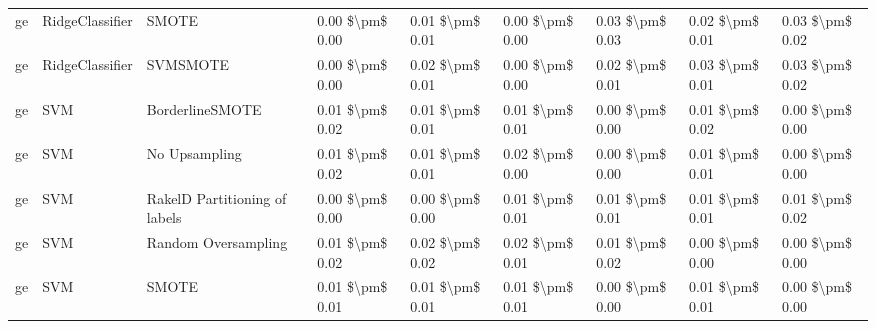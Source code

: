 \begin{tabular}{lllllllll}
      ge &                 RidgeClassifier &                         SMOTE & 0.00 \$\textbackslash pm\$ 0.00 &           0.01 \$\textbackslash pm\$ 0.01 &       0.00 \$\textbackslash pm\$ 0.00 &        0.03 \$\textbackslash pm\$ 0.03 &                         0.02 \$\textbackslash pm\$ 0.01 &     0.03 \$\textbackslash pm\$ 0.02 \\
      ge &                 RidgeClassifier &                      SVMSMOTE & 0.00 \$\textbackslash pm\$ 0.00 &           0.02 \$\textbackslash pm\$ 0.01 &       0.00 \$\textbackslash pm\$ 0.00 &        0.02 \$\textbackslash pm\$ 0.01 &                         0.03 \$\textbackslash pm\$ 0.01 &     0.03 \$\textbackslash pm\$ 0.02 \\
      ge &                             SVM &               BorderlineSMOTE & 0.01 \$\textbackslash pm\$ 0.02 &           0.01 \$\textbackslash pm\$ 0.01 &       0.01 \$\textbackslash pm\$ 0.01 &        0.00 \$\textbackslash pm\$ 0.00 &                         0.01 \$\textbackslash pm\$ 0.02 &     0.00 \$\textbackslash pm\$ 0.00 \\
      ge &                             SVM &                 No Upsampling & 0.01 \$\textbackslash pm\$ 0.02 &           0.01 \$\textbackslash pm\$ 0.01 &       0.02 \$\textbackslash pm\$ 0.00 &        0.00 \$\textbackslash pm\$ 0.00 &                         0.01 \$\textbackslash pm\$ 0.01 &     0.00 \$\textbackslash pm\$ 0.00 \\
      ge &                             SVM & RakelD Partitioning of labels & 0.00 \$\textbackslash pm\$ 0.00 &           0.00 \$\textbackslash pm\$ 0.00 &       0.01 \$\textbackslash pm\$ 0.01 &        0.01 \$\textbackslash pm\$ 0.01 &                         0.01 \$\textbackslash pm\$ 0.01 &     0.01 \$\textbackslash pm\$ 0.02 \\
      ge &                             SVM &           Random Oversampling & 0.01 \$\textbackslash pm\$ 0.02 &           0.02 \$\textbackslash pm\$ 0.02 &       0.02 \$\textbackslash pm\$ 0.01 &        0.01 \$\textbackslash pm\$ 0.02 &                         0.00 \$\textbackslash pm\$ 0.00 &     0.00 \$\textbackslash pm\$ 0.00 \\
      ge &                             SVM &                         SMOTE & 0.01 \$\textbackslash pm\$ 0.01 &           0.01 \$\textbackslash pm\$ 0.01 &       0.01 \$\textbackslash pm\$ 0.01 &        0.00 \$\textbackslash pm\$ 0.00 &                         0.01 \$\textbackslash pm\$ 0.01 &     0.00 \$\textbackslash pm\$ 0.00 \\

\end{tabular}
